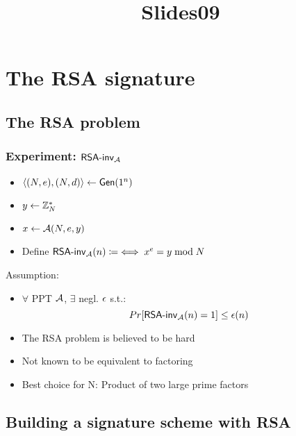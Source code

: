 \documentclass[12pt]{article}
\title{Slides09}
\begin{document}
\maketitle
\tableofcontents
\newpage


\section{The RSA signature}
\subsection{The RSA problem}
\subsubsection{Experiment: $\mathsf{RSA\text{-}inv}_{\mathcal{A}}$}
\begin{itemize}
	\item $\langle (N,e),(N,d)\rangle \leftarrow \operatorname{\mathsf{Gen}}(1^n)$
	\item $y\leftarrow \mathbb{Z}_N^*$
	\item $x \leftarrow \mathcal{A}(N,e,y)$
	\item Define $\mathsf{RSA\text{-}inv}_{\mathcal{A}}(n) \coloneqq \iff x^e = y \bmod{N}$
\end{itemize}
Assumption:
\begin{itemize}
	\item $\forall$ PPT $\mathcal{A}$, $\exists$ negl. $\epsilon$ s.t.:
	\begin{equation*}
		Pr[\mathsf{RSA\text{-}inv}_{\mathcal{A}}(n)=1] \le \epsilon(n)
	\end{equation*}
	\item The RSA problem is believed to be hard
	\item Not known to be equivalent to factoring
	\item Best choice for N: Product of two large prime factors
\end{itemize}

\subsection{Building a signature scheme with RSA}
\end{document}
